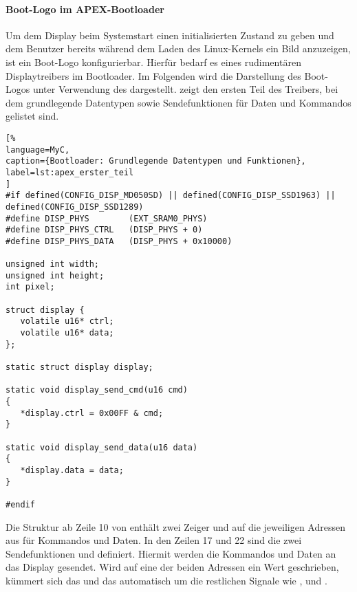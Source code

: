 \paragraph{Boot-Logo im APEX-Bootloader}
\label{cha:bootloader}
Um dem Display beim Systemstart einen initialisierten Zustand zu geben und dem Benutzer bereits während dem Laden des Linux-Kernels ein Bild anzuzeigen, ist ein Boot-Logo konfigurierbar. Hierfür bedarf es eines rudimentären Displaytreibers im Bootloader. Im Folgenden wird die Darstellung des Boot-Logos unter Verwendung des  dargestellt.  zeigt den ersten Teil des Treibers, bei dem grundlegende Datentypen sowie Sendefunktionen für Daten und Kommandos gelistet sind. 

\begin{lstlisting}[%
language=MyC,
caption={Bootloader: Grundlegende Datentypen und Funktionen},
label=lst:apex_erster_teil
]
#if defined(CONFIG_DISP_MD050SD) || defined(CONFIG_DISP_SSD1963) || defined(CONFIG_DISP_SSD1289)
#define DISP_PHYS        (EXT_SRAM0_PHYS)
#define DISP_PHYS_CTRL   (DISP_PHYS + 0)
#define DISP_PHYS_DATA   (DISP_PHYS + 0x10000)

unsigned int width;
unsigned int height;
int pixel;

struct display {
   volatile u16* ctrl;
   volatile u16* data;
};

static struct display display;

static void display_send_cmd(u16 cmd)
{
   *display.ctrl = 0x00FF & cmd;
}

static void display_send_data(u16 data)
{
   *display.data = data;
}

#endif
\end{lstlisting}

Die Struktur  ab Zeile 10 von  enthält zwei Zeiger  und  auf die jeweiligen Adressen aus  für Kommandos und Daten. In den Zeilen 17 und 22 sind die zwei Sendefunktionen  und 
 definiert. Hiermit werden die Kommandos und Daten an das Display gesendet. Wird auf eine der beiden Adressen ein Wert geschrieben, kümmert sich das  und das  automatisch um die restlichen Signale wie ,  und . 

